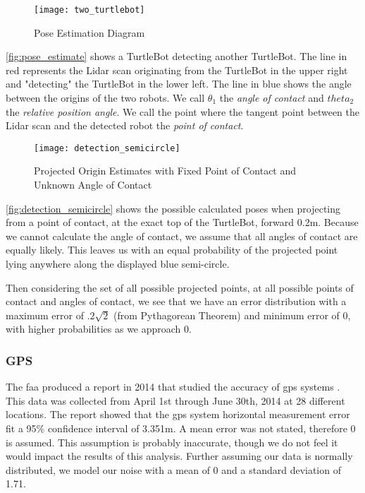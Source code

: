 \documentclass[thesis.tex]{subfile}
\begin{document}
\begin{figure}
\centering
\texttt{[image: two\_turtlebot]}
\caption{Pose Estimation Diagram}
\label{fig:pose_estimate}
\end{figure}

\autoref{fig:pose_estimate} shows a TurtleBot detecting another TurtleBot. The line in red represents the Lidar scan originating from the TurtleBot in the upper right and "detecting" the TurtleBot in the lower left. The line in blue shows the angle between the origins of the two robots. We call $\theta_1$ the \textit{angle of contact} and $theta_2$ the \textit{relative position angle}. We call the point where the tangent point between the Lidar scan and the detected robot the \textit{point of contact}.

\begin{figure}
\centering
\texttt{[image: detection\_semicircle]}
\caption{Projected Origin Estimates with Fixed Point of Contact and Unknown Angle of Contact}
\label{fig:detection_semicircle}
\end{figure}

\autoref{fig:detection_semicircle} shows the possible calculated poses when projecting from a point of contact, at the exact top of the TurtleBot, forward 0.2m. Because we cannot calculate the angle of contact, we assume that all angles of contact are equally likely. This leaves us with an equal probability of the projected point lying anywhere along the displayed blue semi-circle. 

Then considering the set of all possible projected points, at all possible points of contact and angles of contact, we see that we have an error distribution with a maximum error of $.2\sqrt{2}$ (from Pythagorean Theorem) and minimum error of 0, with higher probabilities as we approach 0.

\subsubsection{GPS}
The \gls{faa} produced a report in 2014 that studied the accuracy of \gls{gps} systems \cite{FAAGPS}. This data was collected from April 1st through June 30th, 2014 at 28 different locations. The report showed that the \gls{gps} system horizontal measurement error fit a 95\% confidence interval of 3.351m. A mean error was not stated, therefore 0 is assumed. This assumption is probably inaccurate, though we do not feel it would impact the results of this analysis. Further assuming our data is normally distributed, we model our noise with a mean of 0 and a standard deviation of 1.71.
\end{document}
